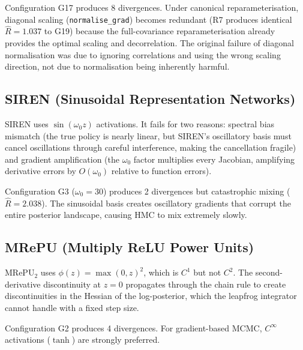 \documentclass[11pt,a4paper]{article}
\theoremstyle{definition}
\newcommand{\code}[1]{\texttt{\color{codecolor}#1}}
\begin{document}
	Configuration G17 produces 8 divergences.
	Under canonical reparameterisation, diagonal scaling (\code{normalise\_grad}) becomes redundant (R7 produces identical $\hat{R} = 1.037$ to G19) because the full-covariance reparameterisation already provides the optimal scaling and decorrelation.
	The original failure of diagonal normalisation was due to ignoring correlations and using the wrong scaling direction, not due to normalisation being inherently harmful.
	
	\subsection{SIREN (Sinusoidal Representation Networks)}
	\label{sec:siren}
	
	SIREN uses $\sin(\omega_0 z)$ activations.
	It fails for two reasons: spectral bias mismatch (the true policy is nearly linear, but SIREN's oscillatory basis must cancel oscillations through careful interference, making the cancellation fragile) and gradient amplification (the $\omega_0$ factor multiplies every Jacobian, amplifying derivative errors by $O(\omega_0)$ relative to function errors).
	
	Configuration G3 ($\omega_0 = 30$) produces 2 divergences but catastrophic mixing ($\hat{R} = 2.038$).
	The sinusoidal basis creates oscillatory gradients that corrupt the entire posterior landscape, causing HMC to mix extremely slowly.
	
	\subsection{MRePU (Multiply ReLU Power Units)}
	\label{sec:mrepu}
	
	MRePU$_2$ uses $\phi(z) = \max(0, z)^2$, which is $C^1$ but not $C^2$.
	The second-derivative discontinuity at $z = 0$ propagates through the chain rule to create discontinuities in the Hessian of the log-posterior, which the leapfrog integrator cannot handle with a fixed step size.
	
	Configuration G2 produces 4 divergences.
	For gradient-based MCMC, $C^\infty$ activations ($\tanh$) are strongly preferred.
	
\end{document}
